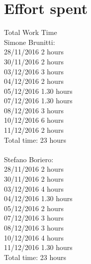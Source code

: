 \documentclass{article}
\begin{document}
\section{Effort spent}
Total Work Time\\
Simone Brunitti:\\
28/11/2016 2 hours\\
30/11/2016 2 hours\\
03/12/2016 3 hours\\
04/12/2016 2 hours\\
05/12/2016 1.30 hours\\
07/12/2016 1.30 hours\\
08/12/2016 3 hours\\
10/12/2016 6 hours\\
11/12/2016 2 hours\\
Total time: 23 hours\\\\
Stefano Boriero:\\
28/11/2016 2 hours\\
30/11/2016 2 hours\\
03/12/2016 4 hours\\
04/12/2016 1.30 hours\\
05/12/2016 2 hours\\ 
07/12/2016 3 hours \\
08/12/2016 3 hours \\
10/12/2016 4 hours \\
11/12/2016 1.30 hours \\
Total time: 23 hours\\
\end{document}
